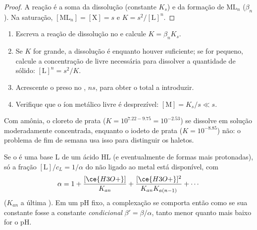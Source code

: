 \begin{proof}
A reação é a soma da dissolução (constante $K_s$) e da formação de
$\mathrm{ML}_n$ ($\beta_n$). Na saturação, $[\mathrm{ML}_n]
= [\mathrm{X}] = s$ e $K = s^2/[\mathrm{L}]^n$.
\end{proof}

\begin{method}\label{met:b1:complexation:dissolve-precipitate}
\begin{enumerate}
  \item Escreva a reação de dissolução no  e calcule
        $K = \beta_n K_s$.
  \item Se $K$ for grande, a dissolução é  enquanto houver
         suficiente; se for pequeno, calcule a concentração de
         livre necessária para dissolver a quantidade de sólido:
        $[\mathrm{L}]^n = s^2/K$.
  \item Acrescente o  preso no , $n s$, para obter o
         total a introduzir.
  \item Verifique que o íon metálico livre é desprezível: $[\mathrm{M}] = K_s/s
        \ll s$.
\end{enumerate}
\end{method}

Com amônia, o cloreto de prata ($K = 10^{7.22 - 9.75} = 10^{-2.53}$) se
dissolve em solução moderadamente concentrada, enquanto o iodeto de
prata ($K = 10^{-8.85}$) não: o problema de fim de semana usa isso para
distinguir os haletos.

\begin{proposition}\label{prop:b1:complexation:ligand-acidity}
Se o  é uma base $\mathrm{L}$ de um ácido $\mathrm{HL}$ (e
eventualmente de formas mais protonadas), só a fração $[\mathrm{L}]/c_L =
1/\alpha$ do  não ligado ao metal está disponível, com
\[
  \alpha = 1 + \frac{[\ce{H3O+}]}{K_{an}} + \frac{[\ce{H3O+}]^2}{K_{an}K_{a(n-1)}}
  + \cdots
\]
($K_{an}$ a última ). Em um pH fixo, a complexação se
comporta então como se sua constante fosse a constante
\emph{condicional} $\beta' = \beta/\alpha$, tanto menor quanto mais
baixo for o pH.
\end{proposition}

